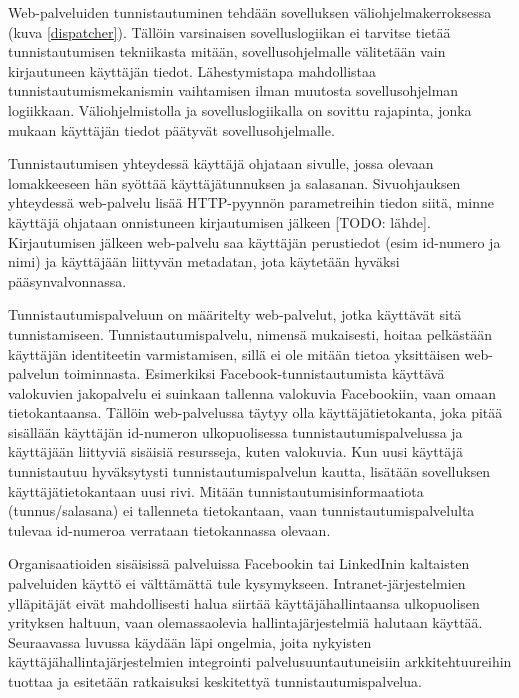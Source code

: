 Web-palveluiden tunnistautuminen tehdään sovelluksen väliohjelmakerroksessa (kuva \ref{dispatcher}). Tällöin varsinaisen sovelluslogiikan ei tarvitse tietää tunnistautumisen tekniikasta mitään, sovellusohjelmalle välitetään vain kirjautuneen käyttäjän tiedot. Lähestymistapa mahdollistaa tunnistautumismekanismin vaihtamisen ilman muutosta sovellusohjelman logiikkaan. Väliohjelmistolla ja sovelluslogiikalla on sovittu rajapinta, jonka mukaan käyttäjän tiedot päätyvät sovellusohjelmalle.

Tunnistautumisen yhteydessä käyttäjä ohjataan sivulle, jossa olevaan lomakkeeseen hän syöttää käyttäjätunnuksen ja salasanan. Sivuohjauksen yhteydessä web-palvelu lisää HTTP-pyynnön parametreihin tiedon siitä, minne käyttäjä ohjataan onnistuneen kirjautumisen jälkeen [TODO: lähde]. Kirjautumisen jälkeen web-palvelu saa käyttäjän perustiedot (esim id-numero ja nimi) ja käyttäjään liittyvän metadatan, jota käytetään hyväksi pääsynvalvonnassa.

Tunnistautumispalveluun on määritelty web-palvelut, jotka käyttävät sitä tunnistamiseen. Tunnistautumispalvelu, nimensä mukaisesti, hoitaa pelkästään käyttäjän identiteetin varmistamisen, sillä ei ole mitään tietoa yksittäisen web-palvelun toiminnasta. Esimerkiksi Facebook-tunnistautumista käyttävä valokuvien jakopalvelu ei suinkaan tallenna valokuvia Facebookiin, vaan omaan tietokantaansa. Tällöin web-palvelussa täytyy olla käyttäjätietokanta, joka pitää sisällään käyttäjän id-numeron ulkopuolisessa tunnistautumispalvelussa ja käyttäjään liittyviä sisäisiä resursseja, kuten valokuvia. Kun uusi käyttäjä tunnistautuu hyväksytysti tunnistautumispalvelun kautta, lisätään sovelluksen käyttäjätietokantaan uusi rivi. Mitään tunnistautumisinformaatiota (tunnus/salasana) ei tallenneta tietokantaan, vaan tunnistautumispalvelulta tulevaa id-numeroa verrataan tietokannassa olevaan.

Organisaatioiden sisäisissä palveluissa Facebookin tai LinkedInin kaltaisten palveluiden käyttö ei välttämättä tule kysymykseen. Intranet-järjestelmien ylläpitäjät eivät mahdollisesti halua siirtää käyttäjähallintaansa ulkopuolisen yrityksen haltuun, vaan olemassaolevia hallintajärjestelmiä halutaan käyttää. Seuraavassa luvussa käydään läpi ongelmia, joita nykyisten käyttäjähallintajärjestelmien integrointi palvelusuuntautuneisiin arkkitehtuureihin tuottaa ja esitetään ratkaisuksi keskitettyä tunnistautumispalvelua.